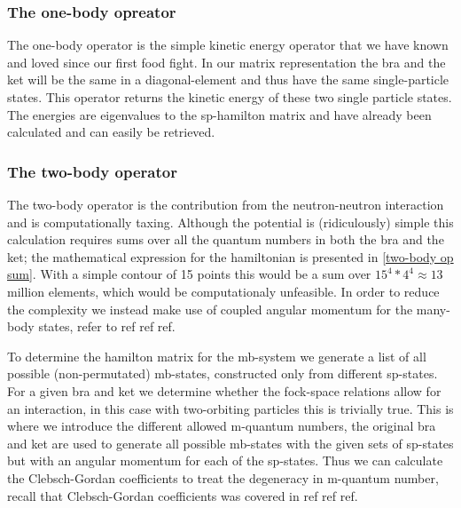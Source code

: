 \subsubsection{The one-body opreator}
The one-body operator is the simple kinetic energy operator that we have known and loved since our first food fight. 
 In our matrix representation the bra and the ket will be the same in a diagonal-element and thus have the same single-particle states.
 This operator returns the kinetic energy of these two single particle states. 
 The energies are eigenvalues to the sp-hamilton matrix and have already been calculated and can easily be retrieved.

\subsubsection{The two-body operator}
The two-body operator is the contribution from the neutron-neutron interaction and is computationally taxing. Although the potential is (ridiculously) simple this calculation requires sums over all the quantum numbers in both the bra and the ket; the mathematical expression for the hamiltonian is presented in \cref{two-body op sum}. 
With a simple contour of 15 points this would be a sum over $15^4*4^4 \approx 13$ million elements, which would be computationaly unfeasible.
In order to reduce the complexity we instead make use of coupled angular momentum for the many-body states, refer to ref ref ref.



To determine the hamilton matrix  for the mb-system we generate a list of all possible (non-permutated) mb-states, constructed only from different sp-states.
For a given bra and ket we determine whether the fock-space relations allow for an interaction, in this case with two-orbiting particles this is trivially true.
This is where we introduce the different allowed m-quantum numbers, the original bra and ket are used to generate all possible mb-states with the given sets of sp-states but with an angular momentum for each of the sp-states.
Thus we can calculate the Clebsch-Gordan coefficients to treat the degeneracy in m-quantum number, recall that Clebsch-Gordan coefficients was covered in ref ref ref.


